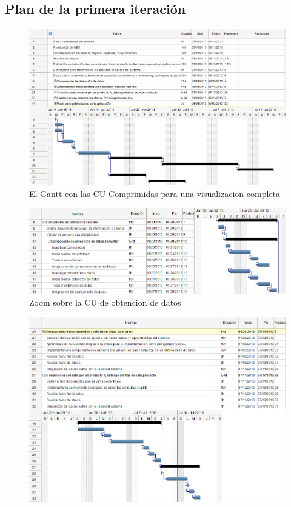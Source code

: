 \begin{landscape}

\subsection{Plan de la primera iteración}

\begin{figure}[H]
\centering
\includegraphics[scale=\escaladefault]{graficos/gantt/gantt.png}
\caption{El Gantt con las CU Comprimidas para una visualizacion completa}
\end{figure}

\begin{figure}[H]
\centering
\includegraphics[scale=\escaladefault]{graficos/gantt/subgantt1.png}
\caption{Zoom sobre la CU de obtencion de datos}
\end{figure}

\begin{figure}[H]
\centering
\includegraphics[scale=\escaladefault]{graficos/gantt/subgantt2.png}
\caption{}
\end{figure}


\end{landscape}
